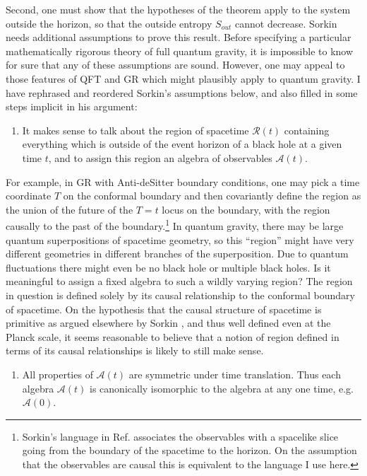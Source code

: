 \documentclass{article}
\begin{document}
Second, one must show that the hypotheses of the theorem apply to the system outside the horizon, so that the outside entropy $S_{out}$ cannot decrease.  Sorkin needs additional assumptions to prove this result.  Before specifying a particular mathematically rigorous theory of full quantum gravity, it is impossible to know for sure that any of these assumptions are sound.  However, one may appeal to those features of QFT and GR which might plausibly apply to quantum gravity.  I have rephrased and reordered Sorkin's assumptions below, and also filled in some steps implicit in his argument:

\setcounter{comment}{0}

\begin{enumerate}

\item It makes sense to talk about the region of spacetime $\mathcal{R}(t)$ containing everything which is outside of the event horizon of a black hole at a given time $t$, and to assign this region an algebra of observables $\mathcal{A}(t)$.

\setcounter{comment}{\value{enumi}}
\end{enumerate}
\noindent
For example, in GR with Anti-deSitter boundary conditions, one may pick a time coordinate $T$ on the conformal boundary and then covariantly define the region as the union of the future of the $T=t$ locus on the boundary, with the region causally to the past of the boundary.\footnote{Sorkin's language in Ref. \cite{sorkin86} associates the observables with a spacelike slice going from the boundary of the spacetime to the horizon.  On the assumption that the observables are causal this is equivalent to the language I use here.}  In quantum gravity, there may be large quantum superpositions of spacetime geometry, so this ``region'' might have very different geometries in different branches of the superposition.  Due to quantum fluctuations there might even be no black hole or multiple black holes. Is it meaningful to assign a fixed algebra to such a wildly varying region?  The region in question is defined solely by its causal relationship to the conformal boundary of spacetime.  On the hypothesis that the causal structure of spacetime is primitive as argued elsewhere by Sorkin \cite{sorkin97}, and thus well defined even at the Planck scale, it seems reasonable to believe that a notion of region defined in terms of its causal relationships is likely to still make sense.
\begin{enumerate}
\setcounter{enumi}{\value{comment}}

\item All properties of $\mathcal{A}(t)$ are symmetric under time translation.  Thus each algebra $\mathcal{A}(t)$ is canonically isomorphic to the algebra at any one time, e.g.
$\mathcal{A}(0)$.

\setcounter{comment}{\value{enumi}}
\end{enumerate}
\end{document}
